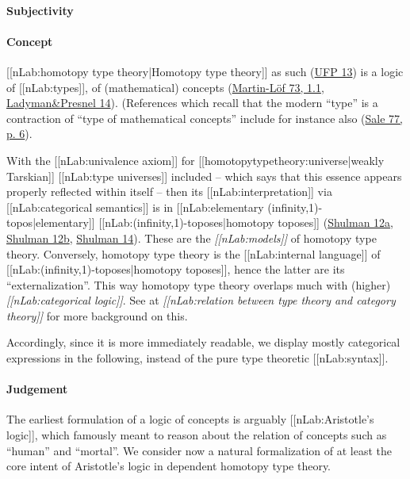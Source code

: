 \documentclass[12pt,titlepage]{article}
\theoremstyle{plain}
\theoremstyle{definition}
\theoremstyle{remark}
\begin{document}
\hypertarget{FormalizationConcepts}{}\paragraph*{{Subjectivity}}\label{FormalizationConcepts}

\hypertarget{ConceptFormalization}{}\paragraph*{{Concept}}\label{ConceptFormalization}

[[nLab:homotopy type theory|Homotopy type theory]] as such (\hyperlink{UFP13}{UFP 13}) is a logic of [[nLab:types]], of (mathematical) concepts (\hyperlink{MartinLoef73}{Martin-Löf 73, 1.1}, \hyperlink{LadymanPresnel14}{Ladyman\&Presnel 14}). (References which recall that the modern ``type'' is a contraction of ``type of mathematical concepts'' include for instance also (\hyperlink{Sale77}{Sale 77, p. 6}).

With the [[nLab:univalence axiom]] for [[homotopytypetheory:universe|weakly Tarskian]] [[nLab:type universes]] included -- which says that this essence appears properly reflected within itself -- then its [[nLab:interpretation]] via [[nLab:categorical semantics]] is in [[nLab:elementary (infinity,1)-topos|elementary]] [[nLab:(infinity,1)-toposes|homotopy toposes]] (\hyperlink{Shulman12a}{Shulman 12a}, \hyperlink{Shulman12b}{Shulman 12b}, \hyperlink{Shulman14}{Shulman 14}). These are the \emph{[[nLab:models]]} of homotopy type theory. Conversely, homotopy type theory is the [[nLab:internal language]] of [[nLab:(infinity,1)-toposes|homotopy toposes]], hence the latter are its ``externalization''. This way homotopy type theory overlaps much with (higher) \emph{[[nLab:categorical logic]]}. See at \emph{[[nLab:relation between type theory and category theory]]} for more background on this.

Accordingly, since it is more immediately readable, we display mostly categorical expressions in the following, instead of the pure type theoretic [[nLab:syntax]].

\hypertarget{JudgementInFormalization}{}\paragraph*{{Judgement}}\label{JudgementInFormalization}

The earliest formulation of a logic of concepts is arguably [[nLab:Aristotle's logic]], which famously meant to reason about the relation of concepts such as ``human'' and ``mortal''. We consider now a natural formalization of at least the core intent of Aristotle's logic in dependent homotopy type theory.
\end{document}
